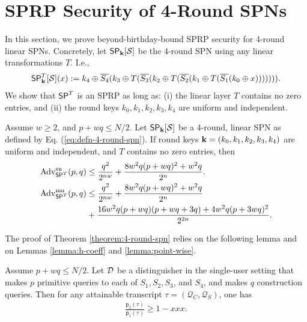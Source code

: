 
\section{SPRP Security of 4-Round SPNs}
\label{section:security of 4-round SPNs}

In this section, we prove beyond-birthday-bound SPRP security for 4-round linear SPNs. Concretely, let $\mathsf{SP}_{\mathbf{k}}[\mathcal{S}]$ be the 4-round SPN using any linear transformations $T$. I.e.,
%
\begin{align}
\mathsf{SP}_{\mathbf{k}}^T[\mathcal{S}](x):=k_4\oplus\overline{S_4}(k_3\oplus T(\overline{S_3}(k_2\oplus T(\overline{S_2}(k_1\oplus T(\overline{S_1}(k_0\oplus x))))))).
\label{eq:defn-4-round-spn}
\end{align}
%
We show that $\mathsf{SP}^T$ is an SPRP as long as: (i) the linear layer $T$ contains no zero entries,
and (ii) the round keys $k_0,k_1,k_2,k_3,k_4$ are uniform and independent.


\begin{theorem}
\label{theorem:4-round-spn}

Assume $w\geq2$, and $p+wq\leq N/2$. Let $\mathsf{SP}_{\mathbf{k}}[\mathcal{S}]$ be a 4-round, linear SPN as defined by Eq. (\ref{eq:defn-4-round-spn}). If round keys $\mathbf{k}=(k_0,k_1,k_2,k_3,k_4)$ are uniform and independent, and $T$ contains no zero entries, then
%
\begin{align}
\operatorname{Adv}_{\mathsf{SP}^T}^{\mathrm{su}}(p, q) &\leq \frac{q^2}{2^{n w}} + \frac{8 w^2 q(p+wq)^2+w^2 q}{2^n}   .  
\notag   \\
\operatorname{Adv}_{\mathsf{SP}^T}^{\mathrm{mu}}(p, q) &\leq \frac{q^2}{2^{n w}} + \frac{8 w^2 q(p+wq)^2+w^2 q}{2^n}    \notag   \\
&+ \frac{16 w^2 q(p+w q)(p+w q +3 q)+4 w^2 q(p+3 wq)^2}{2^{2 n}}.
\notag
\end{align}
\end{theorem}
The proof of Theorem \ref{theorem:4-round-spn} relies on the following lemma and on Lemmas \ref{lemma:h-coeff} and \ref{lemma:point-wise}.


\begin{lemma}
	\label{lemma:proximity-4-round}
	
	Assume $p+wq\leq N/2$. Let $\mathcal{D}$ be a distinguisher in the single-user setting that makes $p$ primitive queries to each of $S_1,S_2,S_3$, and $S_4$, and makes $q$ construction queries. Then for any attainable
	transcript $\tau=(\mathcal{Q}_C,\mathcal{Q}_S)$, one has
	\begin{align}
	\frac{\mathsf{p}_{2}(\tau)}{\mathsf{p}_{1}(\tau)}
	\geq 1 - xxx.
	\label{eq:bound-proximity-4-round}
	\end{align}
\end{lemma}




